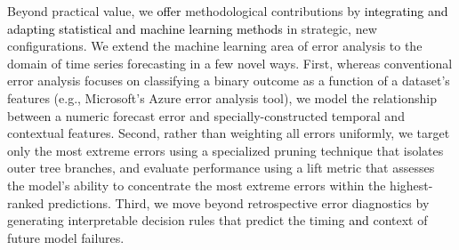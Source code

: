 \documentclass[12pt]{article}
\newcommand{\galit}[1]{\textcolor{black}{#1}}
\begin{document}
Beyond %
practical value, we \galit{offer} %
methodological contributions by %
\galit{integrating and adapting statistical and machine learning methods}
in strategic, new configurations. We extend the machine learning area of error analysis to the domain of time series forecasting in a few novel ways. First, whereas conventional error analysis focuses on classifying a binary outcome as a function of a %
dataset's features (e.g., Microsoft's Azure error analysis tool),
we model the relationship between a numeric forecast error and specially-constructed
temporal and contextual features. Second, rather than weighting all errors uniformly, we target only the most extreme %
errors using a specialized pruning technique that isolates outer tree branches, and evaluate performance using a lift metric that assesses the model's ability to concentrate the most extreme errors within the highest-ranked predictions. Third, we move beyond retrospective error diagnostics by generating interpretable decision rules that predict the timing \galit{and} context %
of future model failures.
\end{document}
